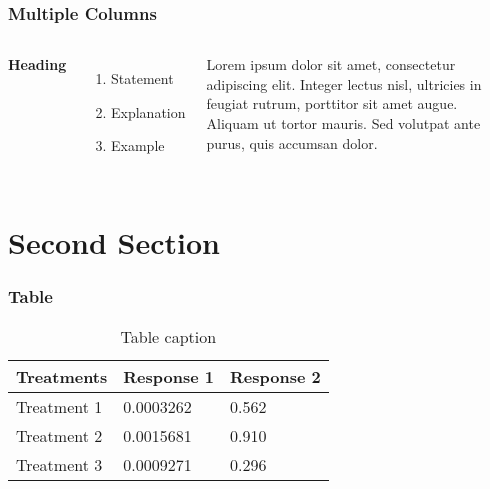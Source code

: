 
\begin{frame}
  \frametitle{Multiple Columns}
  \begin{columns}[c] %

    \textbf{Heading}
    \begin{enumerate}
      \item Statement
      \item Explanation
      \item Example
    \end{enumerate}

    Lorem ipsum dolor sit amet, consectetur adipiscing elit. Integer lectus nisl, ultricies in feugiat rutrum, porttitor sit amet augue. Aliquam ut tortor mauris. Sed volutpat ante purus, quis accumsan dolor.

  \end{columns}
\end{frame}

\section{Second Section}

\begin{frame}
  \frametitle{Table}
  \begin{table}
    \begin{tabular}{l l l}
      \toprule
      \textbf{Treatments} & \textbf{Response 1} & \textbf{Response 2} \\
      \midrule
      Treatment 1         & 0.0003262           & 0.562               \\
      Treatment 2         & 0.0015681           & 0.910               \\
      Treatment 3         & 0.0009271           & 0.296               \\
      \bottomrule
    \end{tabular}
    \caption{Table caption}
  \end{table}
\end{frame}


